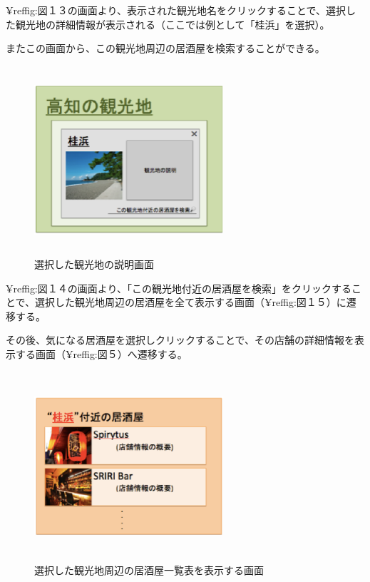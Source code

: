\documentclass[a4j,titlepage]{jarticle}
\begin{document}
¥ref{fig:図１３}の画面より、表示された観光地名をクリックすることで、選択した観光地の詳細情報が表示される（ここでは例として「桂浜」を選択）。



またこの画面から、この観光地周辺の居酒屋を検索することができる。



\begin {figure}[!htbp]
    \begin{center}
    \includegraphics [height=7cm, width=7cm]{14.eps}
    \caption {選択した観光地の説明画面}
    \label {fig:14}
    \end{center}
\end {figure}



¥ref{fig:図１４}の画面より、「この観光地付近の居酒屋を検索」をクリックすることで、選択した観光地周辺の居酒屋を全て表示する画面（¥ref{fig:図１５}）に遷移する。



その後、気になる居酒屋を選択しクリックすることで、その店舗の詳細情報を表示する画面（¥ref{fig:図５}）へ遷移する。
\clearpage
\begin {figure}[!htbp]
    \begin{center}
    \includegraphics [height=7cm, width=7cm]{15.eps}
    \caption {選択した観光地周辺の居酒屋一覧表を表示する画面}
    \label {fig:15}
    \end{center}
\end {figure}
\end{document}
